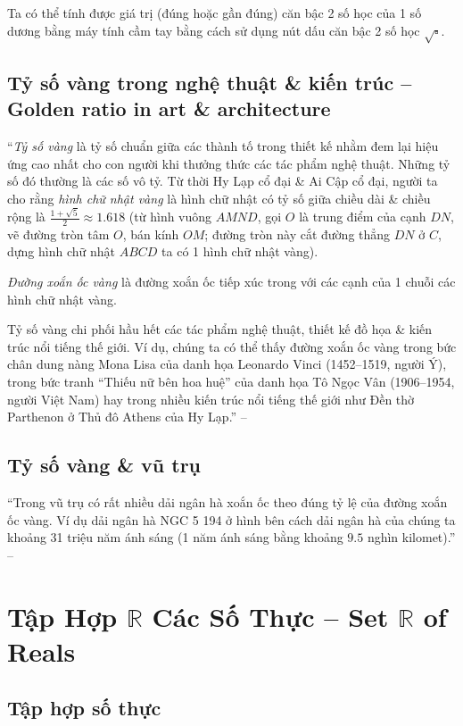 \documentclass[oneside]{book}
\numberwithin{equation}{section}
\begin{document}
Ta có thể tính được giá trị (đúng hoặc gần đúng) căn bậc 2 số học của 1 số dương bằng máy tính cầm tay bằng cách sử dụng nút dấu căn bậc 2 số học $\boxed{\sqrt{\square}}$.

\subsection{Tỷ số vàng trong nghệ thuật \& kiến trúc -- Golden ratio in art \& architecture}
``\textit{Tỷ số vàng} là tỷ số chuẩn giữa các thành tố trong thiết kế nhằm đem lại hiệu ứng cao nhất cho con người khi thưởng thức các tác phẩm nghệ thuật. Những tỷ số đó thường là các số vô tỷ. Từ thời Hy Lạp cổ đại \& Ai Cập cổ đại, người ta cho rằng \textit{hình chữ nhật vàng} là hình chữ nhật có tỷ số giữa chiều dài \& chiều rộng là $\frac{1 + \sqrt{5}}{2}\approx 1.618$ (từ hình vuông $AMND$, gọi $O$ là trung điểm của cạnh $DN$, vẽ đường tròn tâm $O$, bán kính $OM$; đường tròn này cắt đường thẳng $DN$ ở $C$, dựng hình chữ nhật $ABCD$ ta có 1 hình chữ nhật vàng).

\textit{Đường xoắn ốc vàng} là đường xoắn ốc tiếp xúc trong với các cạnh của 1 chuỗi các hình chữ nhật vàng.

Tỷ số vàng chi phối hầu hết các tác phẩm nghệ thuật, thiết kế đồ họa \& kiến trúc nổi tiếng thế giới. Ví dụ, chúng ta có thể thấy đường xoắn ốc vàng trong bức chân dung nàng Mona Lisa của danh họa Leonardo Vinci (1452--1519, người Ý), trong bức tranh ``Thiếu nữ bên hoa huệ'' của danh họa Tô Ngọc Vân (1906--1954, người Việt Nam) hay trong nhiều kiến trúc nổi tiếng thế giới như Đền thờ Parthenon ở Thủ đô Athens của Hy Lạp.'' -- \cite[p. 36]{SGK_Toan_7_Canh_Dieu_tap_1}

\subsection{Tỷ số vàng \& vũ trụ}
``Trong vũ trụ có rất nhiều dải ngân hà xoắn ốc theo đúng tỷ lệ của đường xoắn ốc vàng. Ví dụ dải ngân hà NGC 5 194 ở hình bên cách dải ngân hà của chúng ta khoảng 31 triệu năm ánh sáng (1 năm ánh sáng bằng khoảng $9.5$ nghìn kilomet).'' -- \cite[p. 36]{SGK_Toan_7_Canh_Dieu_tap_1}

\section{Tập Hợp $\mathbb{R}$ Các Số Thực -- Set $\mathbb{R}$ of Reals}

\subsection{Tập hợp số thực}
\end{document}
